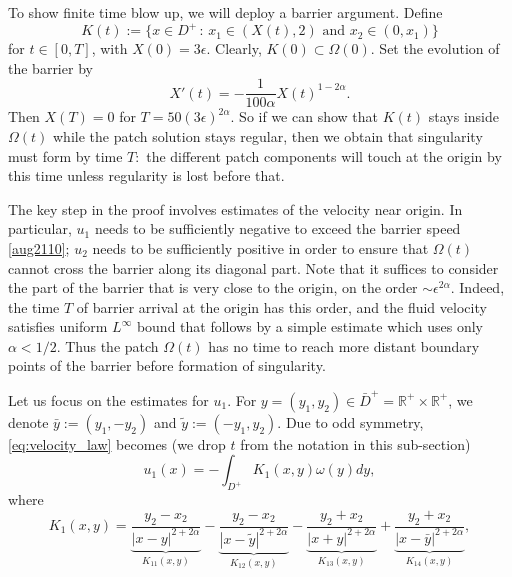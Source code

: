\documentclass[reqno,centertags, 11pt]{amsart}
\def \Rm {\mathbb R}
\newcommand{\eps}{\varepsilon}
\begin{document}
To show finite time blow up, we will deploy a barrier argument. Define
\begin{equation}\label {6.2}
K(t):=\{ x\in D^+ \,:\, x_1\in(X(t),2) \text{ and } x_2\in(0,x_1)\}
\end{equation}
for $t\in[0,T]$, with $X(0) =3\epsilon.$ Clearly, $K(0) \subset \Omega(0).$
Set the evolution of the barrier by
\begin{equation}\label{aug2110}
X'(t)=-\frac 1{100\alpha} X(t)^{1-2\alpha}.
\end{equation}
Then $X(T)=0$ for $T = 50(3\epsilon)^{2\alpha}.$ So if we can show that $K(t)$ stays inside $\Omega(t)$
while the patch solution stays regular, then we obtain that singularity must form by time $T:$
the different patch components will touch at the origin by this time unless regularity is lost before that.


The key step in the proof involves estimates of the velocity near origin.
In particular, $u_1$ needs to be sufficiently negative to exceed
the barrier speed \eqref{aug2110}; $u_2$ needs to be sufficiently positive in order to ensure
that $\Omega (t)$ cannot cross the barrier along its diagonal part. Note that it suffices
to consider the part of the barrier that is very close to the origin, on the order $\sim \epsilon^{2\alpha}.$
Indeed, the time $T$ of barrier arrival at the origin has this order, and the fluid velocity
satisfies uniform $L^\infty$ bound that follows by a simple estimate which uses only $\alpha < 1/2.$
Thus the patch $\Omega(t)$ has no time to reach more distant boundary points of the barrier before
formation of singularity.

Let us focus on the estimates for $u_1.$
For $y=(y_1,y_2)\in \bar D^+ = \Rm^+\times\Rm^+$, we denote $\bar y:=(y_1,-y_2)$
and $\tilde y:=(-y_1,y_2).$
Due to odd symmetry, \eqref{eq:velocity_law} becomes (we drop $t$ from the notation in this sub-section)
\begin{equation}\label{BS12}
u_1(x) = -\int_{D^+} K_1(x,y) \omega(y) dy,
\end{equation}
where
\begin{equation}\label{BS1det}
K_1(x,y) =
\underbrace{\frac{y_2-x_2}{|x-y|^{2+2\alpha}}}_{K_{11}(x,y)} -
\underbrace{\frac{y_2-x_2}{|x-\tilde y|^{2+2\alpha}}}_{K_{12}(x,y)} -
 \underbrace{\frac{y_2+x_2}{|x+y|^{2+2\alpha}}}_{K_{13}(x,y)} +
\underbrace{\frac{y_2+x_2}{|x-\bar y|^{2+2\alpha}}}_{K_{14}(x,y)},
\end{equation}
\end{document}
